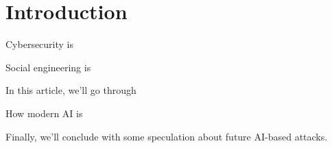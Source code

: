 
\chapter{Introduction\label{intro}}

Cybersecurity is

Social engineering is

In this article, we'll go through

How modern AI is

Finally, we'll conclude with some speculation about future AI-based attacks.